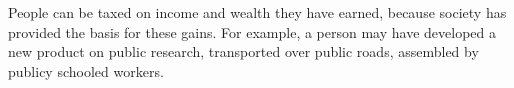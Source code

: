 People can be taxed on income and wealth they have earned, because society has provided the basis for these gains. For example, a person may have developed a new product on public research, transported over public roads, assembled by publicy schooled workers.
